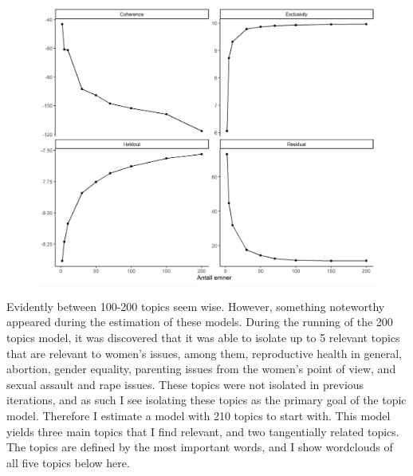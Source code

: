 \documentclass[12pt]{article}
\begin{document}
	\begin{figure}
		\centering
		\includegraphics[scale=0.60]{ksearch.jpg}
	\end{figure}
	
	Evidently between 100-200 topics seem wise. However, something noteworthy appeared during the estimation of these models. During the running of the 200 topics model, it was discovered that it was able to isolate up to 5 relevant topics that are relevant to women's issues, among them, reproductive health in general, abortion, gender equality, parenting issues from the women's point of view, and sexual assault and rape issues. These topics were not isolated in previous iterations, and as such I see isolating these topics as the primary goal of the topic model. Therefore I estimate a model with 210 topics to start with. This model yields three main topics that I find relevant, and two tangentially related topics. The topics are defined by the most important words, and I show wordclouds of all five topics below here.
	
\end{document}
